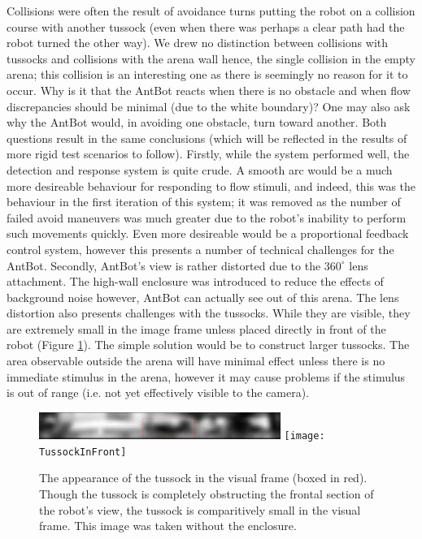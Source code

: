 \documentclass[a4paper,12pt,twoside,openright]{article}
\begin{document}
Collisions were often the result of avoidance turns putting the robot on a collision course with another tussock (even when there was perhaps
a clear path had the robot turned the other way). We drew no distinction between collisions with tussocks and collisions with the arena wall
hence, the single collision in the empty arena; this collision is an interesting one as there is seemingly no reason for it to occur. Why
is it that the AntBot reacts when there is no obstacle and when flow discrepancies should be minimal (due to the white boundary)? One may also
ask why the AntBot would, in avoiding one obstacle, turn toward another. Both questions result in the same conclusions (which will be reflected
in the results of more rigid test scenarios to follow). Firstly, while the system performed well, the detection and response system is quite crude.
A smooth arc would be a much more desireable behaviour for responding to flow stimuli, and indeed, this was the behaviour in the first iteration of
this system; it was removed as the number of failed avoid maneuvers was much greater due to the robot's inability to perform such movements quickly.
Even more desireable would be a proportional feedback control system, however this presents a number of technical challenges for the AntBot. Secondly,
AntBot's view is rather distorted due to the $360^{\circ}$ lens attachment. The high-wall enclosure was introduced to reduce the effects of background noise
however, AntBot can actually see out of this arena. The lens distortion also presents challenges with the tussocks. While they are visible, they are
extremely small in the image frame unless placed directly in front of the robot (Figure \ref{fig:distortion}). The simple
solution would be to construct larger tussocks. The area observable outside the arena will have minimal effect unless there is no immediate stimulus
in the arena, however it may cause problems if the stimulus is out of range (i.e. not yet effectively visible to the camera).

\begin{figure}
  \centering
  \includegraphics[width=0.7\textwidth]{TussockInFrame}
  \texttt{[image: TussockInFront]}
  \caption{
    \label{fig:distortion} The appearance of the tussock in the visual frame (boxed in red). Though the tussock is completely obstructing the frontal
    section of the robot's view, the tussock is comparitively small in the visual frame. This image was taken without the enclosure.
  }
\end{figure}
\end{document}
